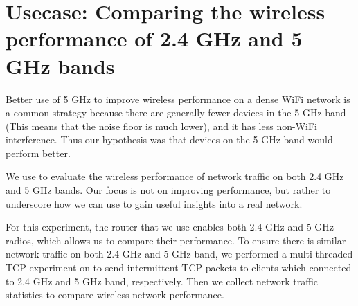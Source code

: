 \section{Usecase: Comparing the wireless performance of 2.4 GHz and 5 GHz bands}
\label{sec.usecase1}

Better use of 5 GHz to improve wireless performance on a dense WiFi network is a common strategy because there are generally fewer devices in the 5 GHz band (This means that the noise floor is much lower), and it has less non-WiFi interference. Thus our hypothesis was that devices on the 5 GHz band would perform better.

We use \sysname to evaluate the wireless performance of network traffic on both 2.4 GHz and 5 GHz bands. Our focus is not on improving performance, but rather to underscore how we can use \sysname to gain useful insights into a real network.

For this experiment, the router that we use enables both 2.4 GHz and 5 GHz radios, which allows us to compare their performance. To ensure there is similar network traffic on both 2.4 GHz and 5 GHz band, we performed a multi-threaded TCP experiment on \sysname to send intermittent TCP packets to clients which connected to 2.4 GHz and 5 GHz band, respectively. Then we collect network traffic statistics to compare wireless network performance.

